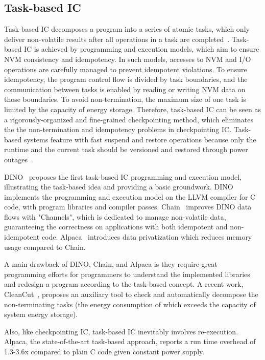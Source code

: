 \subsection{Task-based IC}

Task-based IC decomposes a program into a series of atomic tasks, which only deliver non-volatile results after all operations in a task are completed~\cite{lucia2015simpler}. Task-based IC is achieved by programming and execution models, which aim to ensure NVM consistency and idempotency. In such models, accesses to NVM and I/O operations are carefully managed to prevent idempotent violations. To ensure idempotency, the program control flow is divided by task boundaries, and the communication between tasks is enabled by reading or writing NVM data on those boundaries. To avoid non-termination, the maximum size of one task is limited by the capacity of energy storage. Therefore, task-based IC can be seen as a rigorously-organized and fine-grained checkpointing method, which eliminates the the non-termination and idempotency problems in checkpointing IC. Task-based systems feature with fast suspend and restore operations because only the runtime and the current task should be versioned and restored through power outages~\cite{sliper2018enabling}. 

DINO~\cite{lucia2015simpler} proposes the first task-based IC programming and execution model, illustrating the task-based idea and providing a basic groundwork. DINO implements the programming and execution model on the LLVM compiler for C code, with program libraries and compiler passes. Chain~\cite{colin2016chain} improves DINO data flows with "Channels", which is dedicated to manage non-volatile data, guaranteeing the correctness on applications with both idempotent and non-idempotent code. Alpaca~\cite{maeng2017alpaca} introduces data privatization which reduces memory usage compared to Chain.

A main drawback of DINO, Chain, and Alpaca is they require great programming efforts for programmers to understand the implemented libraries and redesign a program according to the task-based concept. A recent work, CleanCut~\cite{colin2018termination}, proposes an auxiliary tool to check and automatically decompose the non-terminating tasks (the energy consumption of which exceeds the capacity of system energy storage). 

Also, like checkpointing IC, task-based IC inevitably involves re-execution. Alpaca, the state-of-the-art task-based approach, reports a run time overhead of 1.3-3.6x compared to plain C code given constant power supply. 

